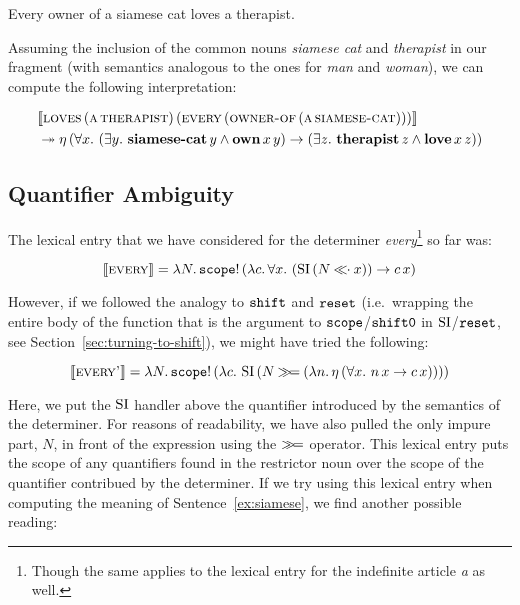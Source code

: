 \begin{exe}
  \ex Every owner of a siamese cat loves a therapist. \label{ex:siamese}
\end{exe}

Assuming the inclusion of the common nouns \emph{siamese cat} and
\emph{therapist} in our fragment (with semantics analogous to the ones for
\emph{man} and \emph{woman}), we can compute the following interpretation:

\NoChapterPrefix
\begin{align}
& \llbracket \textsc{loves}\,(\textsc{a}\,\textsc{therapist})\,(\textsc{every}\,(\textsc{owner-of}\,(\textsc{a}\,\textsc{siamese-cat}))) \rrbracket \nonumber \\
&\twoheadrightarrow \eta\,(\forall x.\ (\exists y.\ \textbf{siamese-cat}\,y \land \textbf{own}\,x\,y) \to (\exists z.\ \textbf{therapist}\,z \land \textbf{love}\,x\,z))
\end{align}
\ChapterPrefix


\subsection{Quantifier Ambiguity}
\label{ssec:quantifier-ambiguity}

The lexical entry that we have considered for the determiner
\emph{every}\footnote{Though the same applies to the lexical entry for the
  indefinite article \emph{a} as well.} so far was:

$$
\llbracket \textsc{every} \rrbracket = \lambda N.\, \mathtt{scope}!\,(\lambda c.\, \forall x.\
      (\operatorname{SI}\,(N \mathbin{\ll\!\!\cdot} x)) \to c\,x)
$$

However, if we followed the analogy to $\mathtt{shift}$ and $\mathtt{reset}$ (i.e.\
wrapping the entire body of the function that is the argument to
$\mathtt{scope}$/$\mathtt{shift0}$ in $\operatorname{SI}$/$\mathtt{reset}$, see
Section~\ref{sec:turning-to-shift}), we might have tried the following:

$$
\llbracket \textsc{every'} \rrbracket = \lambda N.\, \mathtt{scope}!\,(\lambda c.\, \operatorname{SI}\,(N \mathbin{\gg\!=}
        (\lambda n.\, \eta\,(\forall x.\ n\,x \to c\,x))))
$$

Here, we put the $\operatorname{SI}$ handler above the quantifier introduced by the
semantics of the determiner. For reasons of readability, we have also
pulled the only impure part, $N$, in front of the expression using the
$\mathbin{\gg\!=}$ operator. This lexical entry puts the scope of any quantifiers
found in the restrictor noun over the scope of the quantifier contribued by
the determiner. If we try using this lexical entry when computing the
meaning of Sentence~\ref{ex:siamese}, we find another possible reading:

